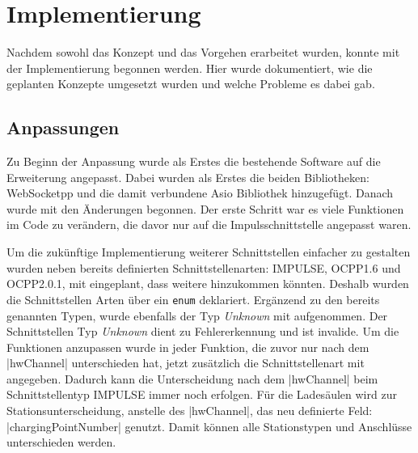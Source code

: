 \section{Implementierung}
Nachdem sowohl das Konzept und das Vorgehen erarbeitet wurden, konnte mit der Implementierung begonnen werden. Hier wurde dokumentiert, wie die geplanten Konzepte umgesetzt wurden und welche Probleme es dabei gab.
\subsection{Anpassungen}
Zu Beginn der Anpassung wurde als Erstes die bestehende Software auf die Erweiterung angepasst. Dabei wurden als Erstes die beiden Bibliotheken: WebSocketpp und die damit verbundene Asio Bibliothek hinzugefügt. Danach wurde mit den Änderungen begonnen. Der erste Schritt war es viele Funktionen im Code zu verändern, die davor nur auf die Impulsschnittstelle angepasst waren.\newline

\noindent Um die zukünftige Implementierung weiterer Schnittstellen einfacher zu gestalten wurden neben bereits definierten Schnittstellenarten: IMPULSE, OCPP1.6 und OCPP2.0.1, mit eingeplant, dass weitere hinzukommen könnten. Deshalb wurden die Schnittstellen Arten über ein \verb|enum| deklariert. Ergänzend zu den bereits genannten Typen, wurde ebenfalls der Typ \textit{Unknown} mit aufgenommen. Der Schnittstellen Typ \textit{Unknown} dient zu Fehlererkennung und ist invalide. Um die Funktionen anzupassen wurde in jeder Funktion, die zuvor nur nach dem \spverb|hwChannel| unterschieden hat, jetzt zusätzlich die Schnittstellenart mit angegeben. Dadurch kann die Unterscheidung nach dem \spverb|hwChannel| beim Schnittstellentyp \glqq{}IMPULSE\grqq{} immer noch erfolgen. Für die Ladesäulen wird zur Stationsunterscheidung, anstelle des \spverb|hwChannel|, das neu definierte Feld: \spverb|chargingPointNumber| genutzt. Damit können alle Stationstypen und Anschlüsse unterschieden werden. 
